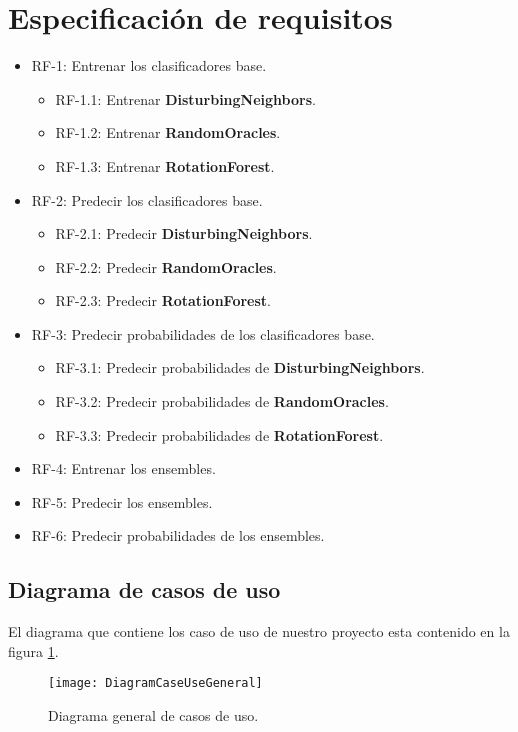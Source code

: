\section{Especificación de requisitos}
\begin{itemize}
	\item RF-1: Entrenar los clasificadores base.
	\begin{itemize}
		\item RF-1.1: Entrenar  \textbf{DisturbingNeighbors}.
		\item RF-1.2: Entrenar  \textbf{RandomOracles}.
		\item RF-1.3: Entrenar  \textbf{RotationForest}.
	\end{itemize}
	\item RF-2: Predecir los clasificadores base.
	\begin{itemize}
		\item RF-2.1: Predecir  \textbf{DisturbingNeighbors}.
		\item RF-2.2: Predecir  \textbf{RandomOracles}.
		\item RF-2.3: Predecir  \textbf{RotationForest}.
	\end{itemize}
	\item RF-3: Predecir probabilidades de los clasificadores base.
	\begin{itemize}
		\item RF-3.1: Predecir probabilidades de \textbf{DisturbingNeighbors}.
		\item RF-3.2: Predecir probabilidades de  \textbf{RandomOracles}.
		\item RF-3.3: Predecir probabilidades de  \textbf{RotationForest}.
	\end{itemize}
	\item RF-4: Entrenar los ensembles.
	\item RF-5: Predecir los ensembles.
	\item RF-6: Predecir probabilidades de los ensembles.
\end{itemize} 

\subsection{Diagrama de casos de uso}
El diagrama que contiene los caso de uso de nuestro proyecto esta contenido en la figura \ref{fig:DiagramCaseUseGeneral}.	

\begin{figure}
\centering
\texttt{[image: DiagramCaseUseGeneral]}
\caption{Diagrama general de casos de uso.}
\label{fig:DiagramCaseUseGeneral}
\end{figure}

